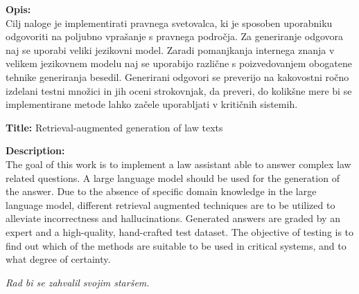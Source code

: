 \documentclass[a4paper,12pt,openright]{book}
\newcommand{\ttitleEn}{Retrieval-augmented generation of law texts}
\newcommand{\clearemptydoublepage}{\newpage{\pagestyle{empty}\cleardoublepage}}
\begin{document}
\bigskip
\noindent\textbf{Opis:}\\
Cilj naloge je implementirati pravnega svetovalca, ki je sposoben uporabniku odgovoriti na poljubno vprašanje s pravnega področja. Za generiranje odgovora naj se uporabi veliki jezikovni model. Zaradi pomanjkanja internega znanja v velikem jezikovnem modelu naj se uporabijo različne s poizvedovanjem obogatene tehnike generiranja besedil. Generirani odgovori se preverijo na kakovostni ročno izdelani testni množici in jih oceni strokovnjak, da preveri, do kolikšne mere bi se implementirane metode lahko začele uporabljati v kritičnih sistemih.


\bigskip
\noindent\textbf{Title:} \ttitleEn

\bigskip
\noindent\textbf{Description:}\\
The goal of this work is to implement a law assistant able to answer complex law related questions. A large language model should be used for the generation of the answer. Due to the absence of specific domain knowledge in the large language model, different retrieval augmented techniques are to be utilized to alleviate incorrectness and hallucinations. Generated answers are graded by an expert and a high-quality, hand-crafted test dataset. The objective of testing is to find out which of the methods are suitable to be used in critical systems, and to what degree of certainty.

\vfill



\vspace{2cm}

\clearemptydoublepage

\thispagestyle{empty}\mbox{}\vfill\null\it%
\noindent
Rad bi se zahvalil svojim staršem.
\rm\normalfont

\clearemptydoublepage




\pagestyle{empty}
\def\thepage{}%
\tableofcontents{}


\clearemptydoublepage
\end{document}
